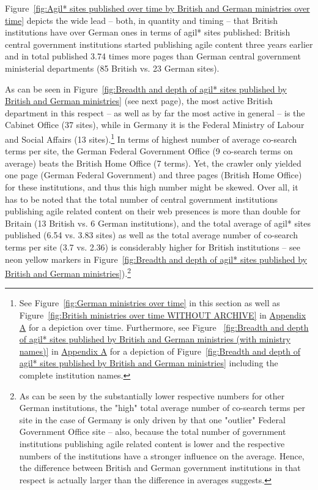 Figure~\ref{fig:Agil* sites published over time by British and German ministries over time} depicts the wide lead – both, in quantity and timing – that British institutions have over German ones in terms of agil* sites published: British central government institutions started publishing agile content three years earlier and in total published 3.74 times more pages than German central government ministerial departments (85 British vs. 23 German sites).

As can be seen in Figure~\ref{fig:Breadth and depth of agil* sites published by British and German ministries} (see next page), the most active British department in this respect – as well as by far the most active in general – is the Cabinet Office (37 sites), while in Germany it is the Federal Ministry of Labour and Social Affairs (13 sites).\footnote{See Figure~\ref{fig:German ministries over time} in this section as well as Figure~\ref{fig:British ministries over time WITHOUT ARCHIVE} in \hyperref[Appendix A]{Appendix A} for a depiction over time. Furthermore, see Figure
~\ref{fig:Breadth and depth of agil* sites published by British and German ministries (with ministry names)} in \hyperref[Appendix A]{Appendix A} for a depiction of Figure~\ref{fig:Breadth and depth of agil* sites published by British and German ministries} including the complete institution names.} In terms of highest number of average co-search terms per site, the German Federal Government Office (9 co-search terms on average) beats the British Home Office (7 terms). Yet, the crawler only yielded one page (German Federal Government) and three pages (British Home Office) for these institutions, and thus this high number might be skewed. Over all, it has to be noted that the total number of central government institutions publishing agile related content on their web presences is more than double for Britain (13 British vs. 6 German institutions), and the total average of agil* sites published (6.54 vs. 3.83 sites) as well as the total average number of co-search terms per site (3.7 vs. 2.36) is considerably higher for British institutions – see neon yellow markers in Figure~\ref{fig:Breadth and depth of agil* sites published by British and German ministries}).\footnote{As can be seen by the substantially lower respective numbers for other German institutions, the "high" total average number of co-search terms per site in the case of Germany is only driven by that one "outlier" Federal Government Office site – also, because the total number of government institutions publishing agile related content is lower and the respective numbers of the institutions have a stronger influence on the average. Hence, the difference between British and German government institutions in that respect is actually larger than the difference in averages suggests.}

